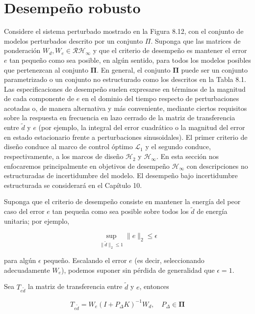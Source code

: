 \section{Desempeño robusto}
Considere el sistema perturbado mostrado en la Figura 8.12, con el conjunto de modelos perturbados descrito por un conjunto $\Pi$. Suponga que las matrices de ponderación $W_{d}, W_{e} \in \mathcal{R} \mathcal{H}_{\infty}$ y que el criterio de desempeño es mantener el error $e$ tan pequeño como sea posible, en algún sentido, para todos los modelos posibles que pertenezcan al conjunto $\boldsymbol{\Pi}$. En general, el conjunto $\boldsymbol{\Pi}$ puede ser un conjunto parametrizado o un conjunto no estructurado como los descritos en la Tabla 8.1. Las especificaciones de desempeño suelen expresarse en términos de la magnitud de cada componente de $e$ en el dominio del tiempo respecto de perturbaciones acotadas o, de manera alternativa y más conveniente, mediante ciertos requisitos sobre la respuesta en frecuencia en lazo cerrado de la matriz de transferencia entre $\tilde{d}$ y $e$ (por ejemplo, la integral del error cuadrático o la magnitud del error en estado estacionario frente a perturbaciones sinusoidales). El primer criterio de diseño conduce al marco de control óptimo $\mathcal{L}_{1}$ y el segundo conduce, respectivamente, a los marcos de diseño $\mathcal{H}_{2}$ y $\mathcal{H}_{\infty}$. En esta sección nos enfocaremos principalmente en objetivos de desempeño $\mathcal{H}_{\infty}$ con descripciones no estructuradas de incertidumbre del modelo. El desempeño bajo incertidumbre estructurada se considerará en el Capítulo 10.


Suponga que el criterio de desempeño consiste en mantener la energía del peor caso del error $e$ tan pequeña como sea posible sobre todos los $\tilde{d}$ de energía unitaria; por ejemplo,

$$
\sup _{\|\tilde{d}\|_{2} \leq 1}\|e\|_{2} \leq \epsilon
$$

para algún $\epsilon$ pequeño. Escalando el error $e$ (es decir, seleccionando adecuadamente $W_{e}$), podemos suponer sin pérdida de generalidad que $\epsilon=1$.

Sea $T_{e \tilde{d}}$ la matriz de transferencia entre $\tilde{d}$ y $e$, entonces


\begin{equation*}
T_{e \tilde{d}}=W_{e}\left(I+P_{\Delta} K\right)^{-1} W_{d}, \quad P_{\Delta} \in \boldsymbol{\Pi} \tag{8.4}
\end{equation*}


